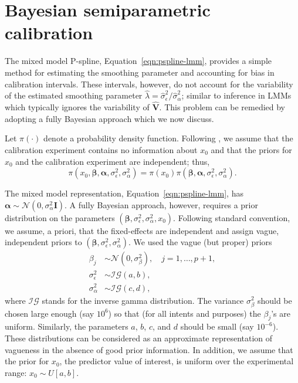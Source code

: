 \documentclass[cmfont,usenames,dvipsnames,leqno]{afit-etd}\usepackage[]{graphicx}\usepackage[]{color}
\newcommand{\mc}[1]{\ensuremath{\mathcal{#1}}}
\newcommand{\wh}[1]{\ensuremath{\widehat{#1}}}
\begin{document}
\section{Bayesian semiparametric calibration}
\label{sec:pspline-bayesian}
The mixed model P-spline, Equation~\eqref{eqn:pspline-lmm}, provides a simple method for estimating the smoothing parameter and accounting for bias in calibration intervals. These intervals, however, do not account for the variability of the estimated smoothing parameter $\wh{\lambda} = \wh{\sigma}_\epsilon^2/\wh{\sigma}_\alpha^2$; similar to inference in LMMs which typically ignores the variability of $\wh{\bm{V}}$. This problem can be remedied by adopting a fully Bayesian approach which we now discuss. 

Let $\pi(\cdot)$ denote a probability density function. Following \citet{hoadley_bayesian_1970}, we assume that the calibration experiment contains no information about $x_0$ and that the priors for $x_0$ and the calibration experiment are independent; thus,
\begin{equation*}
  \pi(x_0, \bm{\beta}, \bm{\alpha}, \sigma_\epsilon^2, \sigma_\alpha^2) = \pi(x_0)\pi(\bm{\beta}, \bm{\alpha}, \sigma_\epsilon^2, \sigma_\alpha^2).
\end{equation*}

The mixed model representation, Equation~\eqref{eqn:pspline-lmm}, has $\bm{\alpha} \sim \mc{N}(0, \sigma_\alpha^2\bm{I})$. A fully Bayesian approach, however, requires a prior distribution on the parameters $(\bm{\beta}, \sigma_\epsilon^2, \sigma_\alpha^2, x_0)$. Following standard convention, we assume, a priori, that the fixed-effects are independent and assign vague, independent priors to $(\bm{\beta}, \sigma_\epsilon^2, \sigma_\alpha^2)$. We used the vague (but proper) priors
\begin{align*}
  \beta_j &\sim \mc{N}\left(0, \sigma_\beta^2\right), \quad j = 1, \dotsc, p+1, \\
  \sigma_\epsilon^2 &\sim \mc{IG}\left(a, b\right), \\
  \sigma_\alpha^2 &\sim \mc{IG}\left(c, d\right),
\end{align*}
where $\mc{IG}$ stands for the inverse gamma distribution. The variance $\sigma_\beta^2$ should be chosen large enough (say $10^6$) so that (for all intents and purposes) the $\beta_j$'s are uniform. Similarly, the parameters $a$, $b$, $c$, and $d$ should be small (say $10^{-6}$). These distributions can be considered as an approximate representation of vagueness in the absence of good prior information. In addition, we assume that the prior for $x_0$, the predictor value of interest, is uniform over the experimental range: $x_0 \sim U[a, b]$. 
\end{document}
